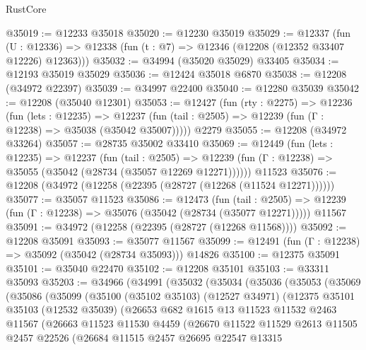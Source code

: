 \begin{lexlean}{RustCore}
\begin{coremodule}
@35019 := @12233 @35018
@35020 := @12230 @35019
@35029 := @12337
    (fun (U : @12336) => @12338 (fun (t : @7) => @12346 (@12208 (@12352 @33407 @12226) @12363)))
@35032 := @34994 (@35020 @35029) @33405
@35034 := @12193 @35019 @35029
@35036 := @12424 @35018 @6870
@35038 := @12208 (@34972 @22397)
@35039 := @34997 @22400
@35040 := @12280 @35039
@35042 := @12208 (@35040 @12301)
@35053 := @12427
    (fun (rty : @2275) =>
    @12236
      (fun (lets : @12235) =>
      @12237 (fun (tail : @2505) => @12239 (fun (Γ : @12238) => @35038 (@35042 @35007)))))
    @2279
@35055 := @12208 (@34972 @33264)
@35057 := @28735 @35002 @33410
@35069 := @12449
    (fun (lets : @12235) =>
    @12237
      (fun (tail : @2505) =>
      @12239 (fun (Γ : @12238) => @35055 (@35042 (@28734 (@35057 @12269 @12271))))))
    @11523
@35076 := @12208 (@34972 (@12258 (@22395 (@28727 (@12268 (@11524 @12271))))))
@35077 := @35057 @11523
@35086 := @12473
    (fun (tail : @2505) => @12239 (fun (Γ : @12238) => @35076 (@35042 (@28734 (@35077 @12271)))))
    @11567
@35091 := @34972 (@12258 (@22395 (@28727 (@12268 @11568))))
@35092 := @12208 @35091
@35093 := @35077 @11567
@35099 := @12491 (fun (Γ : @12238) => @35092 (@35042 (@28734 @35093))) @14826
@35100 := @12375 @35091
@35101 := @35040 @22470
@35102 := @12208 @35101
@35103 := @33311 @35093
@35203 := @34966
    (@34991
      (@35032
        (@35034
          (@35036
            (@35053
              (@35069
                (@35086
                  (@35099
                    (@35100
                      (@35102 @35103)
                      (@12527 @34971)
                      (@12375
                        @35101
                        @35103
                        (@12532 @35039)
                        (@26653
                          @682
                          @1615
                          @13
                          @11523
                          @11532
                          @2463
                          @11567
                          (@26663
                            @11523
                            @11530
                            @4459
                            (@26670
                              @11522
                              @11529
                              @2613
                              @11505
                              @2457
                              @22526
                              (@26684
                                @11515
                                @2457
                                @26695
                                @22547
                                @13315

\end{coremodule}
\end{lexlean}
